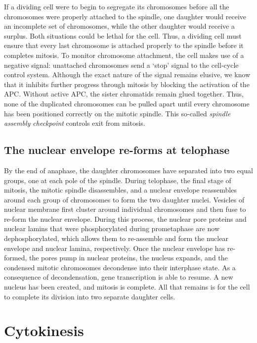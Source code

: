 If a dividing cell were to begin to segregate its chromosomes before all
the chromosomes were properly attached to the spindle, one daughter
would receive an incomplete set of chromosomes, while the other
daughter would receive a surplus. Both situations could be lethal for the
cell. Thus, a dividing cell must ensure that every last chromosome is
attached properly to the spindle before it completes mitosis. To monitor
chromosome attachment, the cell makes use of a negative signal: unattached
chromosomes send a `stop' signal to the cell-cycle control system.
Although the exact nature of the signal remains elusive, we know that it
inhibits further progress through mitosis by blocking the activation of the
APC. Without active APC, the sister chromatids remain glued together.
Thus, none of the duplicated chromosomes can be pulled apart until
every chromosome has been positioned correctly on the mitotic spindle.
This so-called \textit{spindle assembly checkpoint} controls exit from mitosis.

\subsection{The nuclear envelope re-forms at telophase}

By the end of anaphase, the daughter chromosomes have separated into
two equal groups, one at each pole of the spindle. During telophase, the
final stage of mitosis, the mitotic spindle disassembles, and a nuclear
envelope reassembles around each group of chromosomes to form the
two daughter nuclei. Vesicles of nuclear membrane first cluster around
individual chromosomes and then fuse to re-form the nuclear envelope.
During this process, the nuclear pore proteins
and nuclear lamins that were phosphorylated during prometaphase are
now dephosphorylated, which allows them to re-assemble and form the
nuclear envelope and nuclear lamina, respectively. Once
the nuclear envelope has re-formed, the pores pump in nuclear proteins,
the nucleus expands, and the condensed mitotic chromosomes decondense
into their interphase state. As a consequence of decondensation,
gene transcription is able to resume. A new nucleus has been created,
and mitosis is complete. All that remains is for the cell to complete its
division into two separate daughter cells.

\section{Cytokinesis}

